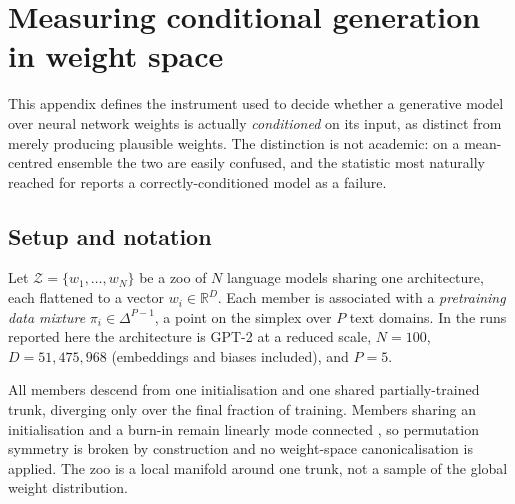 %
%
%

% 

\section{Measuring conditional generation in weight space}
\label{app:conditional-measurement}

This appendix defines the instrument used to decide whether a generative model over
neural network weights is actually \emph{conditioned} on its input, as distinct from
merely producing plausible weights. The distinction is not academic: on a
mean-centred ensemble the two are easily confused, and the statistic most naturally
reached for reports a correctly-conditioned model as a failure.

\subsection{Setup and notation}
\label{app:setup}

Let $\mathcal{Z} = \{w_1,\dots,w_N\}$ be a zoo of $N$ language models sharing one
architecture, each flattened to a vector $w_i \in \mathbb{R}^{D}$. Each member is
associated with a \emph{pretraining data mixture} $\pi_i \in \Delta^{P-1}$, a point on
the simplex over $P$ text domains. In the runs reported here the architecture is
GPT-2 \cite{radford2019gpt2} at a reduced scale, $N = 100$, $D = 51{,}475{,}968$
(embeddings and biases included), and $P = 5$.

All members descend from one initialisation and one shared partially-trained trunk,
diverging only over the final fraction of training. Members sharing an initialisation
and a burn-in remain linearly mode connected \cite{frankle2020lmc}, so permutation
symmetry is broken by construction and no weight-space canonicalisation is applied.
The zoo is a local manifold around one trunk, not a sample of the global weight
distribution.

